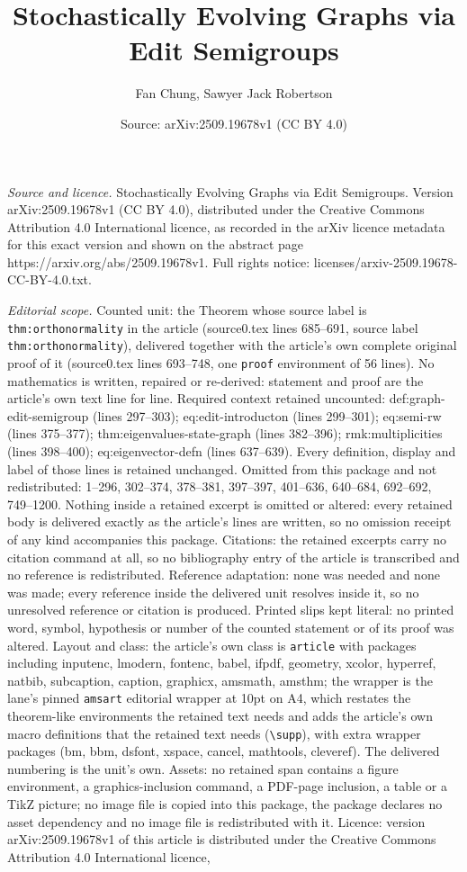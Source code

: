 \documentclass[10pt,a4paper]{amsart}
\title[Stochastically Evolving Graphs via Edit Semigroups]{Stochastically Evolving Graphs via Edit Semigroups}
\author{Fan Chung, Sawyer Jack Robertson}
\date{Source: arXiv:2509.19678v1 (CC BY 4.0)}
\begin{document}
\maketitle

\noindent\emph{Source and licence.} Stochastically Evolving Graphs via Edit Semigroups. Version arXiv:2509.19678v1 (CC BY 4.0), distributed under the Creative Commons Attribution 4.0 International licence, as recorded in the arXiv licence metadata for this exact version and shown on the abstract page https://arxiv.org/abs/2509.19678v1. Full rights notice: licenses/arxiv-2509.19678-CC-BY-4.0.txt.\par\smallskip

\noindent\textit{Editorial scope.} Counted unit: the Theorem whose source label is \texttt{thm:orthonormality} in the article (source0.tex lines 685--691, source label \texttt{thm:orthonormality}), delivered together with the article's own complete original proof of it (source0.tex lines 693--748, one \texttt{proof} environment of 56 lines). No mathematics is written, repaired or re-derived: statement and proof are the article's own text line for line. Required context retained uncounted: def:graph-edit-semigroup (lines 297--303); eq:edit-introducton (lines 299--301); eq:semi-rw (lines 375--377); thm:eigenvalues-state-graph (lines 382--396); rmk:multiplicities (lines 398--400); eq:eigenvector-defn (lines 637--639). Every definition, display and label of those lines is retained unchanged. Omitted from this package and not redistributed: 1--296, 302--374, 378--381, 397--397, 401--636, 640--684, 692--692, 749--1200. Nothing inside a retained excerpt is omitted or altered: every retained body is delivered exactly as the article's lines are written, so no omission receipt of any kind accompanies this package. Citations: the retained excerpts carry no citation command at all, so no bibliography entry of the article is transcribed and no reference is redistributed. Reference adaptation: none was needed and none was made; every reference inside the delivered unit resolves inside it, so no unresolved reference or citation is produced. Printed slips kept literal: no printed word, symbol, hypothesis or number of the counted statement or of its proof was altered. Layout and class: the article's own class is \texttt{article} with packages including inputenc, lmodern, fontenc, babel, ifpdf, geometry, xcolor, hyperref, natbib, subcaption, caption, graphicx, amsmath, amsthm; the wrapper is the lane's pinned \texttt{amsart} editorial wrapper at 10pt on A4, which restates the theorem-like environments the retained text needs and adds the article's own macro definitions that the retained text needs (\texttt{\textbackslash supp}), with extra wrapper packages (bm, bbm, dsfont, xspace, cancel, mathtools, cleveref). The delivered numbering is the unit's own. Assets: no retained span contains a figure environment, a graphics-inclusion command, a PDF-page inclusion, a table or a TikZ picture; no image file is copied into this package, the package declares no asset dependency and no image file is redistributed with it. Licence: version arXiv:2509.19678v1 of this article is distributed under the Creative Commons Attribution 4.0 International licence, 
\end{document}
